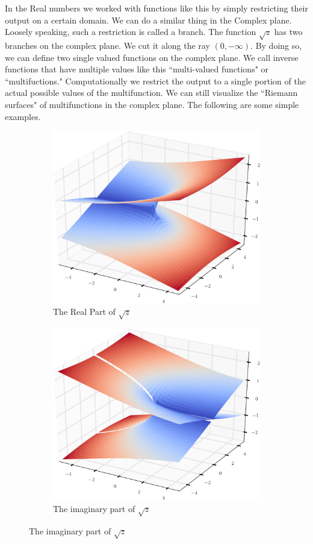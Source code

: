 In the Real numbers we worked with functions like this by simply restricting their output on a certain domain.
We can do a similar thing in the Complex plane.
Loosely speaking, such a restriction is called a branch.
The function $\sqrt{z}$ has two branches on the complex plane.
We cut it along the ray $(0,-\infty)$.
By doing so, we can define two single valued functions on the complex plane.
We call inverse functions that have multiple values like this ``multi-valued functions" or ``multifuctions."
Computationally we restrict the output to a single portion of the actual possible values of the multifunction.
We can still visualize the ``Riemann surfaces" of multifunctions in the complex plane.
The following are some simple examples.
\begin{figure}[h]
\begin{subfigure}{.49\textwidth}
\includegraphics[width=\textwidth]{RiemannSurface1}
\caption{The Real Part of $\sqrt{z}$}
\end{subfigure}
\begin{subfigure}{.49\textwidth}
\includegraphics[width=\textwidth]{RiemannSurface2}
\caption{The imaginary part of $\sqrt{z}$}
\end{subfigure}
\end{figure}
